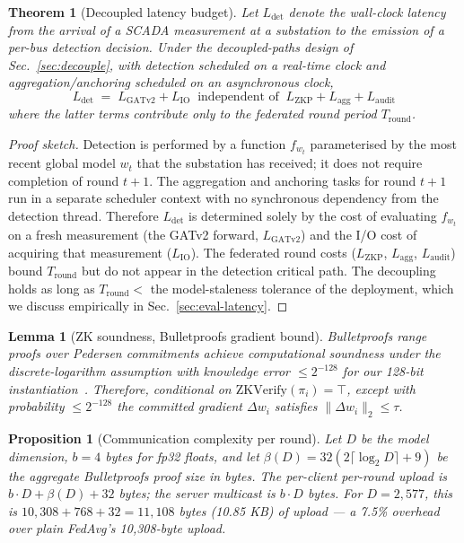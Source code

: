\documentclass[conference]{IEEEtran}
\newtheorem{theorem}{Theorem}
\newtheorem{lemma}{Lemma}
\newtheorem{proposition}{Proposition}
\begin{document}
\begin{theorem}[Decoupled latency budget]
\label{thm:latency}
Let $L_{\mathrm{det}}$ denote the wall-clock latency from the arrival of a SCADA measurement at a substation to the emission of a per-bus detection decision. Under the decoupled-paths design of Sec.~\ref{sec:decouple}, with detection scheduled on a real-time clock and aggregation/anchoring scheduled on an asynchronous clock,
\[
L_{\mathrm{det}} \;=\; L_{\mathrm{GATv2}} + L_{\mathrm{IO}}
\;\;\text{independent of}\;\;
L_{\mathrm{ZKP}} + L_{\mathrm{agg}} + L_{\mathrm{audit}}
\]
where the latter terms contribute only to the federated round period $T_{\mathrm{round}}$.
\end{theorem}

\begin{proof}[Proof sketch]
Detection is performed by a function $f_{w_t}$ parameterised by the most recent global model $w_t$ that the substation has received; it does not require completion of round $t+1$. The aggregation and anchoring tasks for round $t+1$ run in a separate scheduler context with no synchronous dependency from the detection thread. Therefore $L_{\mathrm{det}}$ is determined solely by the cost of evaluating $f_{w_t}$ on a fresh measurement (the GATv2 forward, $L_{\mathrm{GATv2}}$) and the I/O cost of acquiring that measurement ($L_{\mathrm{IO}}$). The federated round costs ($L_{\mathrm{ZKP}}$, $L_{\mathrm{agg}}$, $L_{\mathrm{audit}}$) bound $T_{\mathrm{round}}$ but do not appear in the detection critical path. The decoupling holds as long as $T_{\mathrm{round}} < $ the model-staleness tolerance of the deployment, which we discuss empirically in Sec.~\ref{sec:eval-latency}.
\end{proof}

\begin{lemma}[ZK soundness, Bulletproofs gradient bound]
\label{lem:snd}
Bulletproofs range proofs over Pedersen commitments achieve computational soundness under the discrete-logarithm assumption with knowledge error $\le 2^{-128}$ for our 128-bit instantiation~\cite{bunz2018bulletproofs}. Therefore, conditional on $\mathrm{ZKVerify}(\pi_i)=\top$, except with probability $\le 2^{-128}$ the committed gradient $\Delta w_i$ satisfies $\|\Delta w_i\|_2 \le \tau$.
\end{lemma}

\begin{proposition}[Communication complexity per round]
\label{prop:comm}
Let $D$ be the model dimension, $b=4$ bytes for fp32 floats, and let $\beta(D)=32(2\lceil\log_2 D\rceil+9)$ be the aggregate Bulletproofs proof size in bytes. The per-client per-round upload is $b\cdot D + \beta(D) + 32$ bytes; the server multicast is $b\cdot D$ bytes. For $D=2{,}577$, this is $10{,}308 + 768 + 32 = 11{,}108$ bytes (10.85 KB) of upload — a 7.5\% overhead over plain FedAvg's 10{,}308-byte upload.
\end{proposition}
\end{document}
